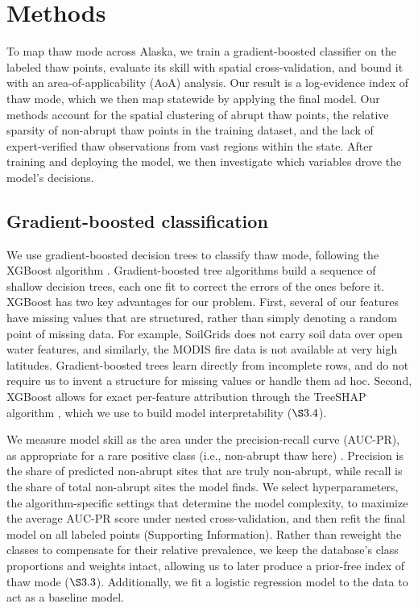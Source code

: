 \documentclass[../main.tex]{subfiles}
\begin{document}
\section{Methods}

To map thaw mode across Alaska, we train a gradient-boosted classifier on the labeled thaw points, evaluate its skill with spatial cross-validation, and bound it with an area-of-applicability (AoA) analysis. Our result is a log-evidence index of thaw mode, which we then map statewide by applying the final model. Our methods account for the spatial clustering of abrupt thaw points, the relative sparsity of non-abrupt thaw points in the training dataset, and the lack of expert-verified thaw observations from vast regions within the state. After training and deploying the model, we then investigate which variables drove the model's decisions.

\subsection{Gradient-boosted classification}

We use gradient-boosted decision trees to classify thaw mode, following the XGBoost algorithm \citep{chen2016xgboost}. Gradient-boosted tree algorithms build a sequence of shallow decision trees, each one fit to correct the errors of the ones before it. XGBoost has two key advantages for our problem. First, several of our features have missing values that are structured, rather than simply denoting a random point of missing data. For example, SoilGrids does not carry soil data over open water features, and similarly, the MODIS fire data is not available at very high latitudes. Gradient-boosted trees learn directly from incomplete rows, and do not require us to invent a structure for missing values or handle them ad hoc. Second, XGBoost allows for exact per-feature attribution through the TreeSHAP algorithm \citep{lundberg2020local}, which we use to build model interpretability ($\S 3.4$).

We measure model skill as the area under the precision-recall curve (AUC-PR), as appropriate for a rare positive class (i.e., non-abrupt thaw here) \citep{saito2015precision}. Precision is the share of predicted non-abrupt sites that are truly non-abrupt, while recall is the share of total non-abrupt sites the model finds. We select hyperparameters, the algorithm-specific settings that determine the model complexity, to maximize the average AUC-PR score under nested cross-validation, and then refit the final model on all labeled points (Supporting Information). Rather than reweight the classes to compensate for their relative prevalence, we keep the database's class proportions and weights intact, allowing us to later produce a prior-free index of thaw mode ($\S 3.3$). Additionally, we fit a logistic regression model to the data to act as a baseline model.
\end{document}

